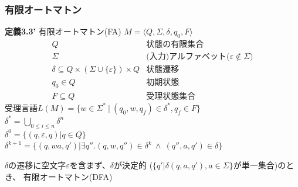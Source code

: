\documentclass[ckj,dvipdfmx]{beamer}
\begin{document}
\begin{frame}
 \frametitle{有限オートマトン}
 \begin{screen}
  {\bf 定義3.3'} 有限オートマトン(FA)
	$M=\langle Q,\Sigma,\delta,q_0,F\rangle$
	\[
	\begin{array}{rl}
	 Q & \mbox{状態の有限集合}\\
	 \Sigma & \mbox{(入力)アルファベット($\varepsilon\notin\Sigma$)}\\
	 \delta\subseteq Q\times(\Sigma\cup\{\varepsilon\})\times Q & \mbox{状態遷移}\\
	 q_0\in Q & \mbox{初期状態}\\
	 F\subseteq Q & \mbox{受理状態集合}
	\end{array}
	\]
	受理言語$L(M)=\{w\in\Sigma^\ast\ |\ (q_0,w,q_f)\in\delta^\ast,
	q_f\in F\}$\\
	$\delta^\ast=\bigcup_{0\leq i\leq n}\delta^n$\\
	$\delta^0=\{(q,\varepsilon,q)|q\in Q\}$\\
	$\delta^{k+1}=\{(q,wa,q')|\exists q''.(q,w,q'')\in\delta^k\
	\wedge\ (q'',a,q')\in\delta\}$
 \end{screen}
 
 $\delta$の遷移に空文字$\varepsilon$を含まず、$\delta$が決定的
 ($\{q'|\delta(q,a,q'),a\in\Sigma\}$が単一集合)のとき、
 有限オートマトン(DFA)
\end{frame}
\end{document}
